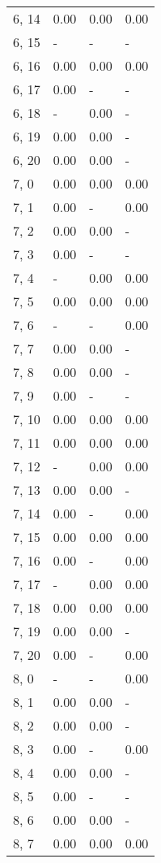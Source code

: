 \begin{table}
\begin{tabular}{llll}
6, 14  &  0.00 &  0.00 &  0.00 \\
6, 15  &     - &     - &     - \\
6, 16  &  0.00 &  0.00 &  0.00 \\
6, 17  &  0.00 &     - &     - \\
6, 18  &     - &  0.00 &     - \\
6, 19  &  0.00 &  0.00 &     - \\
6, 20  &  0.00 &  0.00 &     - \\
7, 0   &  0.00 &  0.00 &  0.00 \\
7, 1   &  0.00 &     - &  0.00 \\
7, 2   &  0.00 &  0.00 &     - \\
7, 3   &  0.00 &     - &     - \\
7, 4   &     - &  0.00 &  0.00 \\
7, 5   &  0.00 &  0.00 &  0.00 \\
7, 6   &     - &     - &  0.00 \\
7, 7   &  0.00 &  0.00 &     - \\
7, 8   &  0.00 &  0.00 &     - \\
7, 9   &  0.00 &     - &     - \\
7, 10  &  0.00 &  0.00 &  0.00 \\
7, 11  &  0.00 &  0.00 &  0.00 \\
7, 12  &     - &  0.00 &  0.00 \\
7, 13  &  0.00 &  0.00 &     - \\
7, 14  &  0.00 &     - &  0.00 \\
7, 15  &  0.00 &  0.00 &  0.00 \\
7, 16  &  0.00 &     - &  0.00 \\
7, 17  &     - &  0.00 &  0.00 \\
7, 18  &  0.00 &  0.00 &  0.00 \\
7, 19  &  0.00 &  0.00 &     - \\
7, 20  &  0.00 &     - &  0.00 \\
8, 0   &     - &     - &  0.00 \\
8, 1   &  0.00 &  0.00 &     - \\
8, 2   &  0.00 &  0.00 &     - \\
8, 3   &  0.00 &     - &  0.00 \\
8, 4   &  0.00 &  0.00 &     - \\
8, 5   &  0.00 &     - &     - \\
8, 6   &  0.00 &  0.00 &     - \\
8, 7   &  0.00 &  0.00 &  0.00 \\

\end{tabular}
\end{table}
